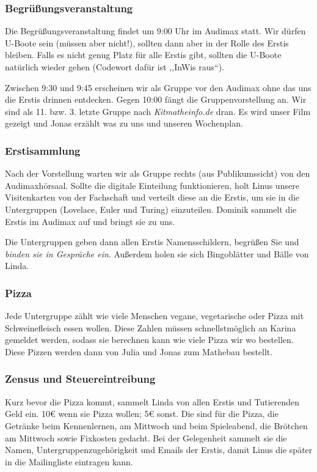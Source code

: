 \documentclass[10pt,ngerman]{scrartcl}
\begin{document}
\begin{multicols}{2}
\subsubsection{Begrüßungsveranstaltung}

Die Begrüßungsveranstaltung findet um 9:00 Uhr im Audimax statt. Wir
dürfen U-Boote sein (müssen aber nicht!), sollten dann aber in der
Rolle des Erstis bleiben. Falls es nicht genug Platz für alle Erstis
gibt, sollten die U-Boote natürlich wieder gehen (Codewort dafür ist
,,InWis raus``). 

Zwischen 9:30 und 9:45 erscheinen wir als Gruppe vor den Audimax ohne das uns
die Erstis drinnen entdecken. Gegen 10:00 fängt die Gruppenvorstellung an.  Wir
sind als 11. bzw. 3. letzte Gruppe nach \emph{Kitmatheinfo.de} dran. Es wird unser
Film gezeigt und Jonas erzählt was zu uns und unseren Wochenplan.

\subsubsection{Erstisammlung}

Nach der Vorstellung warten wir als Gruppe rechts (aus Publikumssicht) von den
Audimaxhörsaal. Sollte die digitale Einteilung funktionieren, holt Linus unsere
Visitenkarten von der Fachschaft und verteilt diese an die Erstis, um sie in
die Untergruppen (Lovelace, Euler und Turing) einzuteilen. Dominik sammelt die
Erstis im Audimax auf und bringt sie zu uns. 

Die Untergruppen geben dann allen Erstis Namensschildern, begrüßen Sie und
\emph{binden sie in Gespräche ein}. Außerdem holen sie sich Bingoblätter und Bälle von Linda.


\subsubsection{Pizza}

Jede Untergruppe zählt wie viele Menschen vegane, vegetarische oder Pizza mit
Schweinefleisch essen wollen. Diese Zahlen müssen schnellstmöglich an Karina
gemeldet werden, sodass sie berechnen kann wie viele Pizza wir wo bestellen.
Diese Pizzen werden dann von Julia und Jonas zum Mathebau bestellt.


\subsubsection{Zensus und Steuereintreibung}

Kurz bevor die Pizza kommt, sammelt Linda von allen Erstis und Tutierenden Geld ein. 10€ wenn sie Pizza wollen; 5€ sonst.
Die sind für die Pizza, die Getränke beim Kennenlernen, am Mittwoch und beim Spieleabend, die Brötchen am Mittwoch sowie Fixkosten gedacht.
Bei der Gelegenheit sammelt sie die Namen, Untergruppenzugehörigkeit und Emails der Erstis, damit Linus die später in die Mailingliste eintragen kann.


\end{multicols}
\end{document}
